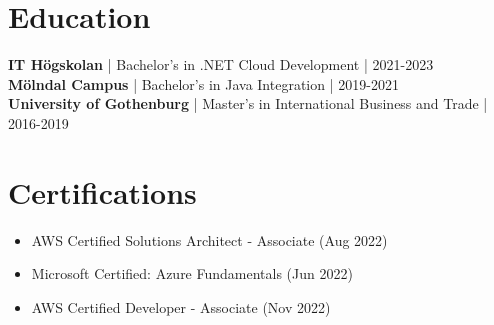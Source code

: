\documentclass[11pt,a4paper]{article}
\begin{document}
\vspace{6pt}
\section*{Education}
\textbf{IT Högskolan} | Bachelor's in .NET Cloud Development | 2021-2023\\
\textbf{Mölndal Campus} | Bachelor's in Java Integration | 2019-2021\\
\textbf{University of Gothenburg} | Master's in International Business and Trade | 2016-2019

\vspace{6pt}
\section*{Certifications}
\begin{itemize}
\item AWS Certified Solutions Architect - Associate (Aug 2022)
\item Microsoft Certified: Azure Fundamentals (Jun 2022)
\item AWS Certified Developer - Associate (Nov 2022)
\end{itemize}
\end{document}
